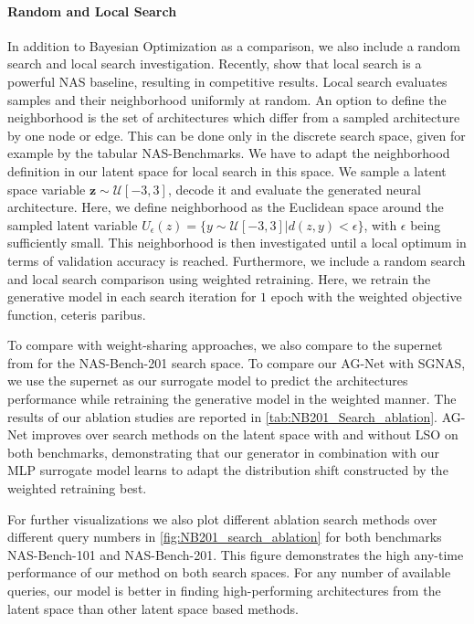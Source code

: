 \documentclass[runningheads]{llncs}
\begin{document}
\paragraph{Random and Local Search}
In addition to Bayesian Optimization as a comparison, we also include a random search \cite{2019RS} and local search investigation. 
Recently, \cite{2020LocalSearchNAS} show that local search is a powerful NAS baseline, resulting in competitive results.
Local search \cite{2020LocalSearchNAS} evaluates samples and their neighborhood uniformly at random.
An option to define the neighborhood is the set of architectures which differ from a sampled architecture by one node or edge.
This can be done only in the discrete search space, given for example by the tabular NAS-Benchmarks.
We have to adapt the neighborhood definition in our latent space for local search in this space.
We sample a latent space variable $\textbf{z} \sim \mathcal{U}[-3,3]$, decode it and evaluate the generated neural architecture.
Here, we define neighborhood as the Euclidean space around the sampled latent variable $ U_{\epsilon}(z) = \{y \sim \mathcal{U}[-3,3] \vert d(z,y) < \epsilon\}$, with $\epsilon $ being sufficiently small.
This neighborhood is then investigated until a local optimum in terms of validation accuracy is reached.
Furthermore, we include a random search and local search comparison using weighted retraining.
Here, we retrain the generative model in each search iteration for $1$ epoch with the weighted objective function, ceteris paribus.


To compare with weight-sharing approaches, we also compare to the supernet from \cite{2021SGNAS} for the NAS-Bench-201 search space.
To compare our AG-Net with SGNAS, we use the supernet as our surrogate model to predict the architectures performance while retraining the generative model in the weighted manner. 
The results of our ablation studies are reported in \autoref{tab:NB201_Search_ablation}.
AG-Net improves over search methods on the latent space with and without LSO on both benchmarks, demonstrating that our generator in combination with our MLP surrogate model learns to adapt the distribution shift constructed by the weighted retraining best.

For further visualizations we also plot different ablation search methods over different query numbers in \autoref{fig:NB201_search_ablation} for both benchmarks NAS-Bench-101 and NAS-Bench-201.
This figure demonstrates the high any-time performance of our method on both search spaces.
For any number of available queries, our model is better in finding high-performing architectures from the latent space than other latent space based methods. 
\end{document}
